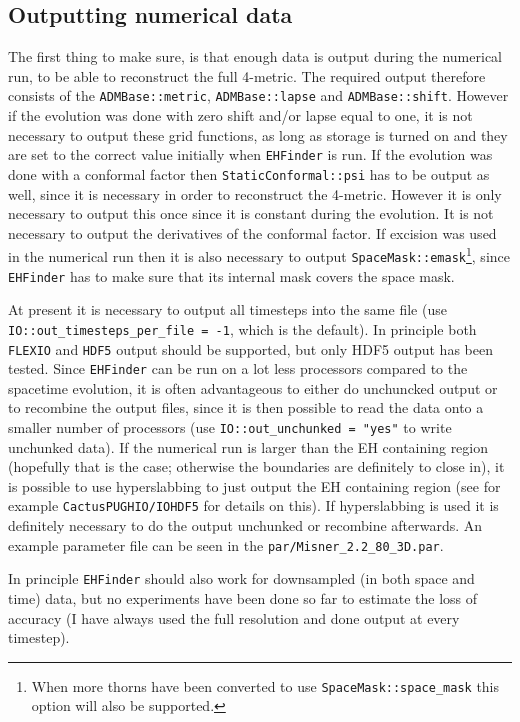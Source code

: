 \subsection{Outputting numerical data}
The first thing to make sure, is that enough data is output during the
numerical run, to be able to reconstruct the full 4-metric. The
required output therefore consists of the {\tt ADMBase::metric},
{\tt ADMBase::lapse} and {\tt ADMBase::shift}. However if the evolution was
done with zero shift and/or lapse equal to one, it is not necessary to output
these grid functions, as long as storage is turned on and they are set to the
correct value initially when {\tt EHFinder} is run. If the evolution was done
with a conformal factor then {\tt StaticConformal::psi} has to be output as
well, since it is necessary in order to reconstruct the 4-metric. However it
is only necessary to output this once since it is constant during the evolution.
It is not necessary to output the derivatives of the conformal factor. If
excision was used in the numerical run then it is also necessary to output 
{\tt SpaceMask::emask}\footnote{When more thorns have been converted to use
{\tt SpaceMask::space\_mask} this option will also be supported.}, since
{\tt EHFinder} has to make sure that its internal mask covers the space mask.

At present it is necessary to output all timesteps into the same file (use
{\tt IO::out\_timesteps\_per\_file = -1}, which is the default). In principle
both {\tt FLEXIO} and {\tt HDF5} output should be supported, but only
HDF5 output has been tested. Since {\tt EHFinder} can be run on a lot less
processors compared to the spacetime evolution, it is often advantageous to
either do unchuncked output or to recombine the output files, since it is then
possible to read the data onto a smaller number of processors (use
{\tt IO::out\_unchunked = "yes"} to write unchunked data). If the numerical
run is larger than the EH containing region (hopefully that is the case;
otherwise the boundaries are definitely to close in), it is possible to
use hyperslabbing to just output the EH containing region (see for example
{\tt CactusPUGHIO/IOHDF5} for details on this). If hyperslabbing is used it
is definitely necessary to do the output unchunked or recombine afterwards.
An example parameter file can be seen in the {\tt par/Misner\_2.2\_80\_3D.par}.

In principle {\tt EHFinder} should also work for downsampled (in both space
and time) data, but no experiments have been done so far to estimate the loss
of accuracy (I have always used the full resolution and done output at
every timestep).

